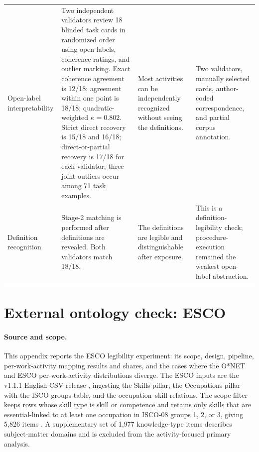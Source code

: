 \documentclass[10pt]{article}
\begin{document}
\begin{table}[!ht]
\begin{tabularx}{\textwidth}{@{}p{}p{}p{}X@{}}
Open-label interpretability & Two independent validators review 18 blinded task cards in randomized order using open labels, coherence ratings, and outlier marking. Exact coherence agreement is 12/18; agreement within one point is 18/18; quadratic-weighted $\kappa=0.802$. Strict direct recovery is 15/18 and 16/18; direct-or-partial recovery is 17/18 for each validator; three joint outliers occur among 71 task examples. & Most activities can be independently recognized without seeing the definitions. & Two validators, manually selected cards, author-coded correspondence, and partial corpus annotation. \\
Definition recognition & Stage-2 matching is performed after definitions are revealed. Both validators match 18/18. & The definitions are legible and distinguishable after exposure. & This is a definition-legibility check; procedure-execution remained the weakest open-label abstraction. \\
\bottomrule
\end{tabularx}
\end{table}

\section{External ontology check: ESCO}
\label{app:esco}

\paragraph{Source and scope.}
This appendix reports the ESCO legibility experiment: its scope, design, pipeline, per-work-activity mapping results and shares, and the cases where the O{*}NET and ESCO per-work-activity distributions diverge. The ESCO inputs are the v1.1.1 English CSV release \citep{esco2022v111}, ingesting the Skills pillar, the Occupations pillar with the ISCO groups table, and the occupation--skill relations.
The scope filter keeps rows whose skill type is skill or competence and retains only skills that are essential-linked to at least one occupation in ISCO-08 groups 1, 2, or 3, giving 5{,}826 items \citep{esco2022v111}.
A supplementary set of 1{,}977 knowledge-type items describes subject-matter domains and is excluded from the activity-focused primary analysis.
\end{document}
